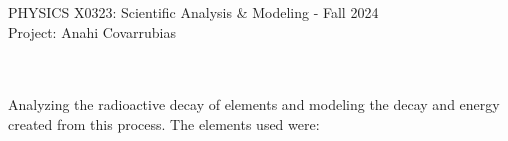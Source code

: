 \documentclass[12pt]{article}
\begin{document}
\def\pos{\medskip\quad}
\def\subpos{\smallskip \qquad}

\begin{center}
{\large
PHYSICS  X0323: Scientific Analysis \& Modeling - Fall 2024
}\\
{\large Project: Anahi Covarrubias }\\\vskip0.25in
\end{center}
 \\



\vskip0.1in
 \\

 Analyzing the radioactive decay of elements and modeling the decay and energy created from this process. The elements used were:

\end{document}
